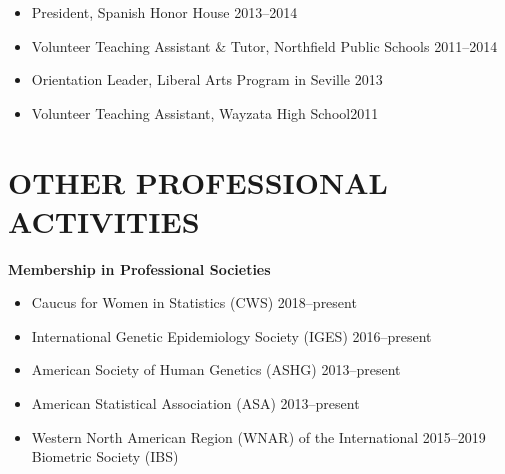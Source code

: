 \documentclass[margin]{res}
\begin{document}
\begin{resume}
\begin{itemize}
			\item President, Spanish Honor House \hfill 2013--2014
			
			\item Volunteer Teaching Assistant \& Tutor, Northfield Public Schools \hfill 2011--2014
			
			
			
			\item Orientation Leader, Liberal Arts Program in Seville \hfill 2013 
			
			
			
			\item Volunteer Teaching Assistant, Wayzata High School\hfill 2011 \\
\end{itemize}





\section{OTHER PROFESSIONAL \\ ACTIVITIES}  	

\hspace{0.1cm}\textbf{Membership in Professional Societies}
\begin{itemize}	 %
\item Caucus for Women in Statistics (CWS) \hfill 2018--present
\item International Genetic Epidemiology Society (IGES) \hfill 2016--present
\item American Society of Human Genetics (ASHG) \hfill 2013--present
\item American Statistical Association (ASA) \hfill 2013--present
\item Western North American Region (WNAR) of the International \hfill 2015--2019 \\  Biometric Society (IBS)  %
\end{itemize}
	

\end{resume}
\end{document}
